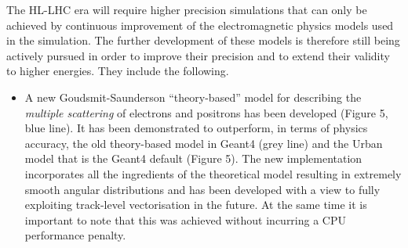 \documentclass[12pt,a4paper]{article}
\begin{document}
The HL-LHC era will require higher precision simulations that can only
be achieved by continuous improvement of the electromagnetic physics
models used in the simulation. The further development of these models
is therefore still being actively pursued in order to improve their
precision and to extend their validity to higher energies. They include
the following.

\begin{itemize}
\item
  A new Goudsmit-Saunderson ``theory-based'' model for describing the
  \emph{multiple scattering} of electrons and positrons has been
  developed (Figure 5, blue line). It has been demonstrated to
  outperform, in terms of physics accuracy, the old theory-based model
  in Geant4 (grey line) and the Urban model that is the Geant4 default
  (Figure 5). The new implementation incorporates all the ingredients of
  the theoretical model resulting in extremely smooth angular
  distributions and has been developed with a view to fully exploiting
  track-level vectorisation in the future. At the same time it is
  important to note that this was achieved without incurring a CPU
  performance penalty.
\end{itemize}
\end{document}

